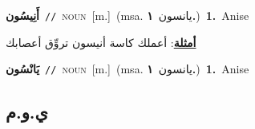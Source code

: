 \documentclass[10pt,a4paper,twoside]{article} %
\begin{document}
\begin{multicols}{2}
{{{{{{{\setlength\topsep{0pt}\textbf{\foreignlanguage{arabic}{أَنِيسُون}}\ {\color{gray}\texttt{//}\color{black}}\ \textsc{noun}\ [m.]\ \color{gray}(msa. \foreignlanguage{arabic}{يانسون}~\foreignlanguage{arabic}{\textbf{١.}})\color{black}\ \textbf{1.}~Anise\  \begin{flushright}\color{gray}\foreignlanguage{arabic}{\textbf{\underline{\foreignlanguage{arabic}{أمثلة}}}: أعملك كاسة أنيسون تروِّق أعصابك}\end{flushright}\color{black}} \vspace{2mm}

{\setlength\topsep{0pt}\textbf{\foreignlanguage{arabic}{يَانْسُون}}\ {\color{gray}\texttt{//}\color{black}}\ \textsc{noun}\ [m.]\ \color{gray}(msa. \foreignlanguage{arabic}{يانسون}~\foreignlanguage{arabic}{\textbf{١.}})\color{black}\ \textbf{1.}~Anise\ 

\vspace{-3mm}
\subsection*{\color{blue}\foreignlanguage{arabic}{ي.و.م}\color{blue}{}} 

}}}}}}}
\end{multicols}
\end{document}
